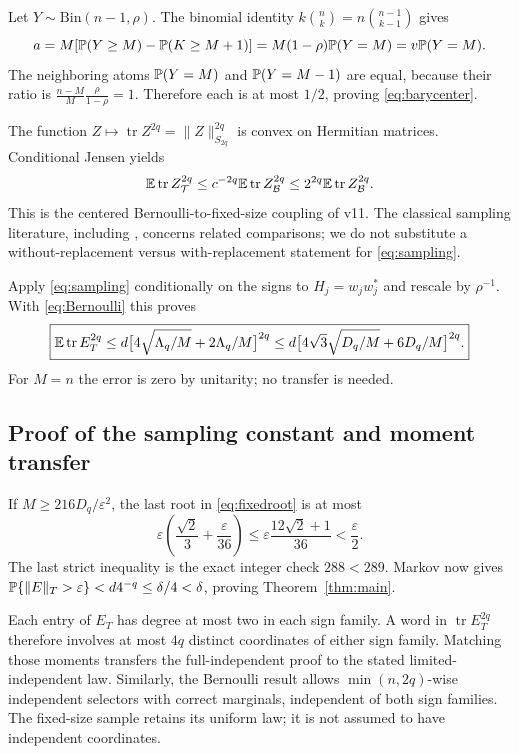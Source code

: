 \documentclass[11pt]{article}
\numberwithin{equation}{section}
\theoremstyle{definition}\newtheorem{definition}[theorem]{Definition}
\theoremstyle{remark}\newtheorem{remark}[theorem]{Remark}
\newcommand{\tr}{\operatorname{tr}}\newcommand{\Ent}{\operatorname{Ent}}
\newcommand{\norm}[1]{\lVert#1\rVert}\newcommand{\ip}[2]{\langle#1,#2\rangle}
\begin{document}
Let $Y\sim\mathrm{Bin}(n-1,\rho)$. The binomial identity $k\binom nk=n\binom{n-1}{k-1}$ gives
\[
 a=M[\mathbb P(Y\ge M)-\mathbb P(K\ge M+1)]
   =M(1-\rho)\mathbb P(Y=M)=v\mathbb P(Y=M).
\]
The neighboring atoms $\mathbb P(Y=M)$ and $\mathbb P(Y=M-1)$ are equal, because their ratio is $\frac{n-M}{M}\frac{\rho}{1-\rho}=1$. Therefore each is at most $1/2$, proving \eqref{eq:barycenter}.

The function $Z\mapsto\tr Z^{2q}=\norm Z_{S_{2q}}^{2q}$ is convex on Hermitian matrices. Conditional Jensen yields
\begin{equation}
 \E\tr Z_{\mathcal T}^{2q}\le c^{-2q}\E\tr Z_{\mathcal B}^{2q}
      \le2^{2q}\E\tr Z_{\mathcal B}^{2q}.
 \label{eq:sampling}
\end{equation}
This is the centered Bernoulli-to-fixed-size coupling of v11. The classical sampling literature, including \cite{GrossNesme}, concerns related comparisons; we do not substitute a without-replacement versus with-replacement statement for \eqref{eq:sampling}.

Apply \eqref{eq:sampling} conditionally on the signs to $H_j=w_jw_j^*$ and rescale by $\rho^{-1}$. With \eqref{eq:Bernoulli} this proves
\begin{equation}
 \boxed{\E\tr E_T^{2q}
 \le d\big[4\sqrt{\Lambda_q/M}+2\Lambda_q/M\big]^{2q}
 \le d\big[4\sqrt3\sqrt{D_q/M}+6D_q/M\big]^{2q}.}
 \label{eq:fixedroot}
\end{equation}
For $M=n$ the error is zero by unitarity; no transfer is needed.

\subsection{Proof of the sampling constant and moment transfer}
If $M\ge216D_q/\varepsilon^2$, the last root in \eqref{eq:fixedroot} is at most
\begin{equation}
 \varepsilon\left(\frac{\sqrt2}{3}+\frac{\varepsilon}{36}\right)
 \le\varepsilon\frac{12\sqrt2+1}{36}<\frac\varepsilon2.
 \label{eq:216check}
\end{equation}
The last strict inequality is the exact integer check $288<289$. Markov now gives $\Prob\{\norm E_T>\varepsilon\}<d4^{-q}\le\delta/4<\delta$, proving Theorem~\ref{thm:main}.

Each entry of $E_T$ has degree at most two in each sign family. A word in $\tr E_T^{2q}$ therefore involves at most $4q$ distinct coordinates of either sign family. Matching those moments transfers the full-independent proof to the stated limited-independent law. Similarly, the Bernoulli result allows $\min(n,2q)$-wise independent selectors with correct marginals, independent of both sign families. The fixed-size sample retains its uniform law; it is not assumed to have independent coordinates.
\end{document}
